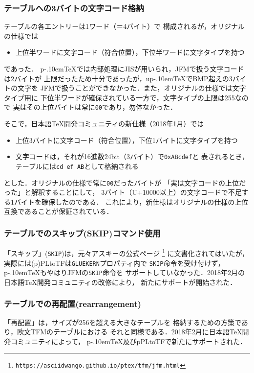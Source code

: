 \documentclass[a4paper,11pt,nomag]{jsarticle}
\def\code#1{\texttt{#1}}
\def\pTeX{p\kern-.10em\TeX}\def\upTeX{u\pTeX}
\begin{document}
\subsubsection{テーブルへの3バイトの文字コード格納}
テーブルの各エントリーは1ワード（＝4バイト）で
構成されるが，オリジナルの仕様では
\begin{itemize}
  \item 上位半ワードに文字コード（符合位置），下位半ワードに文字タイプを持つ
\end{itemize}
であった．
\pTeX{}では内部処理にJISが用いられ，JFMで扱う文字コードは2バイトが
上限だったため十分であったが，\upTeX{}でBMP超えの3バイトの文字を
JFMで扱うことができなかった．また，オリジナルの仕様では文字タイプ用に
下位半ワードが確保されている一方で，文字タイプの上限は255なので
実はその上位バイトは常に\code{00}であり，勿体なかった．

そこで，日本語\TeX{}開発コミュニティの新仕様（2018年1月）では
\begin{itemize}
  \item 上位3バイトに文字コード（符合位置），下位1バイトに文字タイプを持つ
  \item 文字コードは，それが16進数24bit（3バイト）で\code{0xABcdef}と
    表されるとき，テーブルには\code{cd ef AB}として格納される
\end{itemize}
とした．オリジナルの仕様で常に\code{00}だったバイトが
「実は文字コードの上位だった」と解釈することにして，
3バイト（U+10000以上）の文字コードで不足する1バイトを確保したのである．
これにより，新仕様はオリジナルの仕様の上位互換であることが保証されている．

\subsubsection{テーブルでのスキップ(SKIP)コマンド使用}
「スキップ」(\code{SKIP})は，元々アスキーの公式ページ
\footnote{\texttt{https://asciidwango.github.io/ptex/tfm/jfm.html}}
に文書化されてはいたが，実際には(p)PLtoTFは\code{GLUEKERN}プロパティ内で
\code{SKIP}命令を受け付けず，\pTeX{}もやはりJFMの\code{SKIP}命令を
サポートしていなかった．2018年2月の日本語\TeX{}開発コミュニティの改修により，
新たにサポートが開始された．

\subsubsection{テーブルでの再配置(rearrangement)}
「再配置」は，サイズが256を超える大きなテーブルを
格納するための方策であり，欧文TFMのテーブルにおける
それと同様である．2018年2月に日本語\TeX{}開発コミュニティによって，
\pTeX{}及びpPLtoTFで新たにサポートされた．
\end{document}
